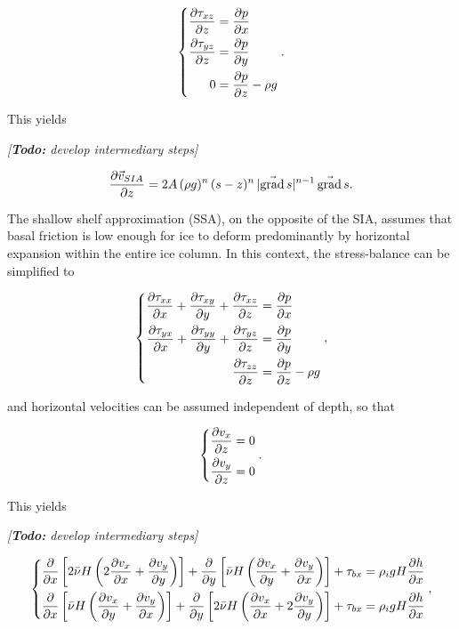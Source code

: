 \documentclass{article}
\newcommand{\todo}[1]{\emph{[\textbf{Todo:} #1]}}
\renewcommand{\grad}[1]{\vec{\mathrm{grad}}\,#1}
\begin{document}
\begin{equation}
    \left\{\begin{aligned}
        \pdv{\tau_{xz}}{z} &= \pdv{p}{x} \\
        \pdv{\tau_{yz}}{z} &= \pdv{p}{y} \\
        0 &= \pdv{p}{z} - \rho g
    \end{aligned}\right..
\end{equation}

This yields

\todo{develop intermediary steps}

\begin{equation}
    \pdv{\vec{v}_{SIA}}{z} = 2A\,(\rho g)^n\,(s-z)^n\,
                             |\grad{s}|^{n-1}\,\grad{s}.
\end{equation}

The shallow shelf approximation (SSA), on the opposite of the SIA, assumes that
basal friction is low enough for ice to deform predominantly by horizontal
expansion within the entire ice column. In this context, the stress-balance can
be simplified to

\begin{equation}
    \left\{\begin{aligned}
        \pdv{\tau_{xx}}{x} + \pdv{\tau_{xy}}{y} + \pdv{\tau_{xz}}{z}
            &= \pdv{p}{x} \\
        \pdv{\tau_{yx}}{x} + \pdv{\tau_{yy}}{y} + \pdv{\tau_{yz}}{z}
            &= \pdv{p}{y} \\
        \pdv{\tau_{zz}}{z} &= \pdv{p}{z} - \rho g
    \end{aligned}\right.,
\end{equation}

and horizontal velocities can be assumed independent of depth, so that

\begin{equation}
    \left\{\begin{aligned}
        \pdv{v_x}{z} &= 0 \\
        \pdv{v_y}{z} &= 0 \\
    \end{aligned}\right..
\end{equation}

This yields

\todo{develop intermediary steps}

\begin{equation}
    \left\{\begin{aligned}
        \pdv{x} \left[2\bar{\nu}H
                      \left(2\pdv{v_x}{x} + \pdv{v_y}{y}\right) \right]
            + \pdv{y} \left[\bar{\nu}H
                            \left(\pdv{v_x}{y} + \pdv{v_y}{x}\right) \right]
            + \tau_{bx} &= \rho_i gH \pdv{h}{x} \\
        \pdv{x} \left[\bar{\nu}H
                      \left(\pdv{v_x}{y} + \pdv{v_y}{x}\right) \right]
            + \pdv{y} \left[2\bar{\nu}H
                            \left(\pdv{v_x}{x} + 2\pdv{v_y}{y}\right) \right]
            + \tau_{bx} &= \rho_i gH \pdv{h}{x} \\
    \end{aligned}\right.,
\end{equation}
\end{document}
